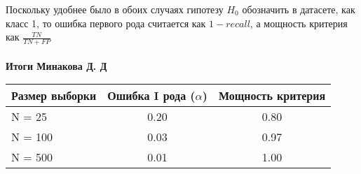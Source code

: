 
Поскольку удобнее было в обоих случаях гипотезу $H_0$ обозначить в датасете, как класс 1, то ошибка первого рода считается как $1 - recall$, а мощность критерия как $\frac{TN}{TN + FP}$
\\
\\
\noindent \textbf{Итоги Минакова Д. Д}

\begin{table}[h]
    \centering
    \begin{tabular}{lcc}
    \toprule
    \textbf{Размер выборки} & \textbf{Ошибка I рода ($\alpha$)} & \textbf{Мощность критерия} \\
    \midrule
    N = 25   & 0.20 & 0.80 \\
    N = 100  & 0.03 & 0.97 \\
    N = 500  & 0.01 & 1.00 \\
    \bottomrule
    \end{tabular}
    \label{tab:power_analysis}
\end{table}

